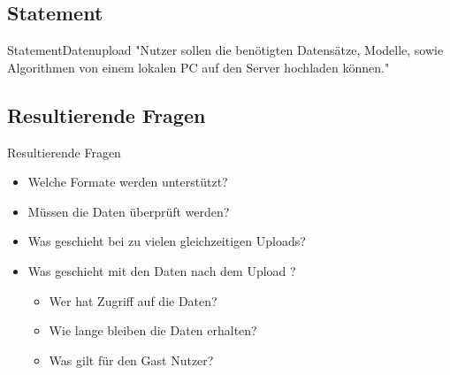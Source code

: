 \documentclass{beamer}
\begin{document}
	\subsection[Statement]{Statement}
	\begin{frame}{Statement}{Datenupload}
			"Nutzer sollen die benötigten Datensätze, Modelle, sowie Algorithmen von einem lokalen PC auf den Server hochladen können."
	\end{frame}
	
	\subsection[Resultierende Fragen]{Resultierende Fragen}
	\begin{frame}[<+->][t]{Resultierende Fragen}
		\begin{itemize}		
			\item Welche Formate werden unterstützt?
			\item Müssen die Daten überprüft werden?
			\item Was geschieht bei zu vielen gleichzeitigen Uploads?
			\item Was geschieht mit den Daten nach dem Upload ?
			\begin{itemize}	
				\item Wer hat Zugriff auf die Daten?
				\item Wie lange bleiben die Daten erhalten?
				\item Was gilt für den Gast Nutzer?
			\end{itemize}
		\end{itemize}
	\end{frame}
	
\end{document}

